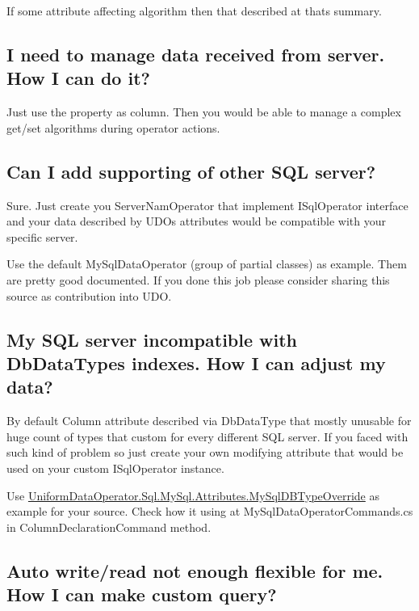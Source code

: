 If some attribute affecting algorithm then that described at that\textquotesingle{}s summary.

\subsection*{I need to manage data received from server. How I can do it?}

Just use the property as column. Then you would be able to manage a complex get/set algorithms during operator actions.

\subsection*{Can I add supporting of other S\+QL server?}

Sure. Just create you Server\+Nam\+Operator that implement I\+Sql\+Operator interface and your data described by U\+DO\textquotesingle{}s attributes would be compatible with your specific server.

Use the default My\+Sql\+Data\+Operator (group of partial classes) as example. Them are pretty good documented. If you done this job please consider sharing this source as contribution into U\+DO.

\subsection*{My S\+QL server incompatible with Db\+Data\+Type\textquotesingle{}s indexes. How I can adjust my data?}

By default \textquotesingle{}Column\textquotesingle{} attribute described via Db\+Data\+Type that mostly unusable for huge count of types that custom for every different S\+QL server. If you faced with such kind of problem so just create your own modifying attribute that would be used on your custom I\+Sql\+Operator instance.

Use \textquotesingle{}\mbox{\hyperlink{class_uniform_data_operator_1_1_sql_1_1_my_sql_1_1_attributes_1_1_my_sql_d_b_type_override}{Uniform\+Data\+Operator.\+Sql.\+My\+Sql.\+Attributes.\+My\+Sql\+D\+B\+Type\+Override}}\textquotesingle{} as example for your source. Check how it using at \textquotesingle{}My\+Sql\+Data\+Operator\+Commands.\+cs\textquotesingle{} in \textquotesingle{}Column\+Declaration\+Command\textquotesingle{} method.

\subsection*{Auto write/read not enough flexible for me. How I can make custom query?}

